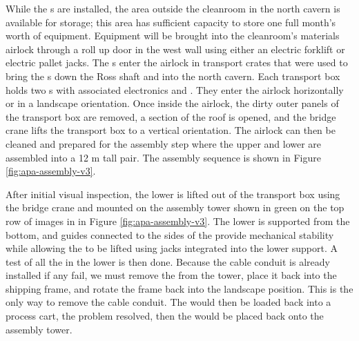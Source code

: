While the s are installed, the area outside the cleanroom in the north cavern is available for storage; this area has sufficient capacity to store one full month's worth of equipment. 
Equipment will be brought into the cleanroom's materials airlock through a roll up door in the west wall using either an electric forklift or electric pallet jacks.  
The s enter the airlock in transport crates that were used to bring the s down the Ross shaft and into the north cavern. 
Each transport box holds two s with associated electronics and . They enter the airlock horizontally or in a landscape orientation. 
Once inside the airlock, the dirty outer panels of the transport box are removed, a section of the roof is opened, and the bridge crane lifts the transport box to a vertical orientation. 
The airlock can then be cleaned and prepared for the  assembly step where the upper and lower  are assembled into a 12 \si{m} tall pair.
The  assembly sequence is shown in Figure \ref{fig:apa-assembly-v3}.

After initial visual inspection, the lower  is lifted out of the transport box 
using the bridge crane and mounted on the  assembly tower shown in green on the top row of images in in Figure \ref{fig:apa-assembly-v3}. 
The  lower  is supported from the bottom, and guides connected to the sides of the  provide mechanical stability while allowing the  to be lifted using jacks integrated into the lower support. A test of all the  in the lower  is then done.  Because the cable conduit is already installed if any  fail, we must remove the  from the tower, place it back into the shipping frame, and rotate the frame back into the landscape position.  This is the only way to remove the cable conduit. The  would then be loaded back into a process cart, the problem resolved, then the  would be placed back onto the assembly tower. 

